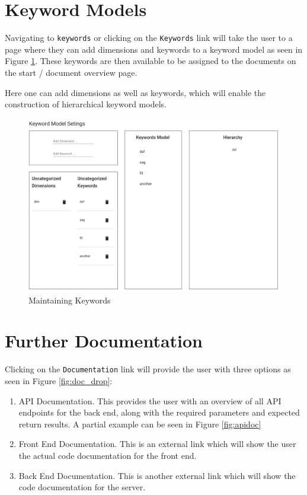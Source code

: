 \documentclass{article}
\begin{document}
\section{Keyword Models}
Navigating to \verb|keywords| or clicking on the \verb|Keywords| link will take the user to a page where they can add dimensions and keywords to a keyword model as seen in Figure \ref{fig:key1}. These keywords are then available to be assigned to the documents on the start / document overview page.

Here one can add dimensions as well as keywords, which will enable the construction of hierarchical keyword models.

\begin{figure}
    \centering
    \includegraphics[scale=0.4]{img/key1.png}
    \caption{Maintaining Keywords}
    \label{fig:key1}
\end{figure}

\section{Further Documentation}
Clicking on the \verb|Documentation| link will provide the user with three options as seen in Figure \ref{fig:doc_drop}:

\begin{enumerate}
    \item API Documentation. This provides the user with an overview of all API endpoints for the back end, along with the required parameters and expected return results. A partial example can be seen in Figure \ref{fig:apidoc}
    \item Front End Documentation. This is an external link which will show the user the actual code documentation for the front end.
    \item Back End Documentation. This is another external link which will show the code documentation for the server.
\end{enumerate}
\end{document}
